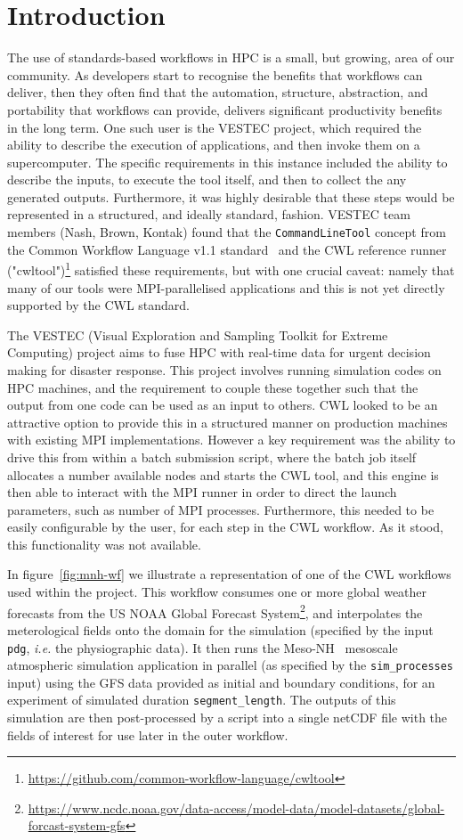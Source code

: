 \documentclass[conference]{IEEEtran}
\newcommand{\cwl}[1]{\texttt{#1}}
\begin{document}
\section{Introduction}
The use of standards-based workflows in HPC is a small, but growing, area of our community. As developers start to recognise the benefits that workflows can deliver, then they often find that the automation, structure, abstraction, and portability that workflows can provide, delivers significant productivity benefits in the long term. One such user is the VESTEC project, which required the ability to describe the execution of applications, and then invoke them on a supercomputer. The specific requirements in this instance included the ability to describe the inputs, to execute the tool itself, and then to collect the any generated outputs. Furthermore, it was highly desirable that these steps would be represented in a structured, and ideally standard, fashion. VESTEC team members (Nash, Brown, Kontak) found that the \cwl{CommandLineTool} concept from the Common Workflow Language v1.1 standard~\cite{cwl10} and the CWL reference runner ("cwltool")\footnote{\url{https://github.com/common-workflow-language/cwltool}} satisfied these requirements, but with one crucial caveat: namely that many of our tools were MPI-parallelised applications and this is not yet directly supported by the CWL standard.

The VESTEC (Visual Exploration and Sampling Toolkit for Extreme Computing) project aims to fuse HPC with real-time data for urgent decision making for disaster response. This project involves running simulation codes on HPC machines, and the requirement to couple these together such that the output from one code can be used as an input to others. CWL looked to be an attractive option to provide this in a structured manner on production machines with existing MPI implementations. However a key requirement was the ability to drive this from within a batch submission script, where the batch job itself allocates a number available nodes and starts the CWL tool, and this engine is then able to interact with the MPI runner in order to direct the launch parameters, such as number of MPI processes. Furthermore, this needed to be easily configurable by the user, for each step in the CWL workflow. As it stood, this functionality was not available.

In figure~\ref{fig:mnh-wf} we illustrate a representation of one of the CWL workflows used within the project. This workflow consumes one or more global weather forecasts from the US NOAA Global Forecast System\footnote{\url{https://www.ncdc.noaa.gov/data-access/model-data/model-datasets/global-forcast-system-gfs}}, and interpolates the meterological fields onto the domain for the simulation (specified by the input \verb`pdg`, \emph{i.e.} the physiographic data). 
It then runs the Meso-NH~\cite{mnh54} mesoscale atmospheric simulation application in parallel (as specified by the \verb`sim_processes` input) using the GFS data provided as initial and boundary conditions, for an experiment of simulated duration \verb`segment_length`. The outputs of this simulation are then post-processed by a script into a single netCDF file with the fields of interest for use later in the outer workflow.
\end{document}
